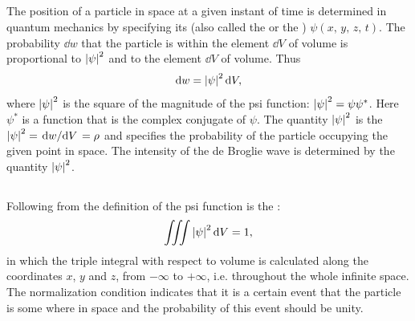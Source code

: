 \subsection{}\label{38.2.1} The position of a particle in space at a given instant of time is determined in quantum mechanics by specifying its  (also called the  or the )  $\psi (x,\, y,\, z,\, t)$. The probability $\dd w$ that the particle is within the element $\dd V$ of volume is proportional to $\abs{\psi}^{2}$ and to the element $\dd V$ of volume. Thus
\begin{equation*}%
\dd w = \abs{\psi}^{2}\, \dd V,
\end{equation*}
where $\abs{\psi}^{2}$ is the square of the magnitude of the psi function: $\abs{\psi}^{2} = \psi \psi^{*}$. Here $\psi^{*}$ is a function that is the complex conjugate of $\psi$. The quantity $\abs{\psi}^{2}$ is the  $\abs{\psi}^{2} = \dv*{w}{V} = \rho$ and specifies the probability of the particle occupying the given point in space. The intensity of the de Broglie wave is determined by the quantity $\abs{\psi}^{2}$.

\subsection{}\label{38.2.2} Following from the definition of the psi function is the :
\begin{equation*}%
 \iiint \abs{\psi}^{2}\, \dd V = 1,
\end{equation*}
in which the triple integral with respect to volume is calculated along the coordinates $x$, $y$ and $z$, from $-\infty$ to $+\infty$, i.e. throughout the whole infinite space. The normalization condition indicates that it is a certain event that the particle is some­ where in space and the probability of this event should be unity.

